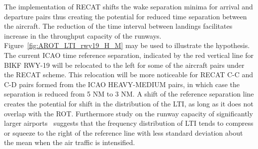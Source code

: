 
The implementation of RECAT shifts the wake separation minima for arrival and departure pairs thus creating the potential for reduced time separation between the aircraft. The reduction of the time interval between landings facilitates increase in the throughput capacity of the runways. 
Figure~\ref{fig:AROT_LTI_rwy19_H_M} may be used to illustrate the hypothesis. The current ICAO time reference separation, indicated by the red vertical line for BIKF RWY-19 will be relocated to the left for some of the aircraft pairs under the RECAT scheme. This relocation will be more noticeable for RECAT C-C and C-D pairs formed from the ICAO HEAVY-MEDIUM pairs, in which case the separation is reduced from 5 NM to 3 NM. A shift of the reference separation line creates the potential for shift in the distribution of the LTI, as long as it does not overlap with the ROT. Furthermore study on the runway capacity of significantly larger airports~\cite{kolos2013influence} suggests that the frequency distribution of LTI tends to compress or squeeze to the right of the reference line with less standard deviation about the mean when the air traffic is intensified.

